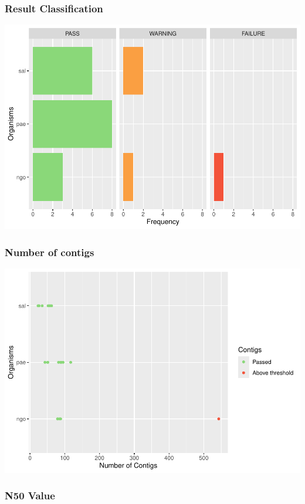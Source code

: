 \documentclass[
  a4paper,
]{article}
\begin{document}
\subsubsection{Result Classification}\label{result-classification}

\includegraphics{qualifyr_report_2024-07-23_files/figure-latex/organism results-1.pdf}

\subsubsection{Number of contigs}\label{number-of-contigs}

\includegraphics{qualifyr_report_2024-07-23_files/figure-latex/unnamed-chunk-1-1.pdf}

\subsubsection{N50 Value}\label{n50-value}
\end{document}
